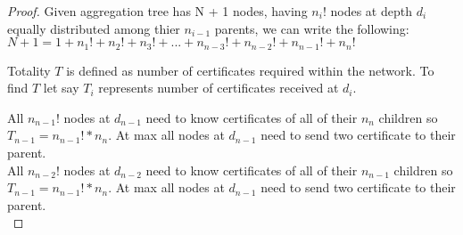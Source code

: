 \begin{proof}
	Given aggregation tree has N + 1 nodes, having $n_{i}!$ nodes at depth $d_{i}$ equally distributed among thier $n_{i-1}$ parents, we can write the following:\\
	$ N + 1 = 1 + n_{1}! + n_{2}! + n_{3}! + ... + n_{n - 3}! + n_{n - 2}! + n_{n - 1}! + n_{n}! $

	Totality $T$ is defined as number of certificates required within the network. To find $T$ let say $T_{i}$ represents number of certificates received at $d_{i}$.

	All $ n_{n-1} ! $ nodes at $ d_{n-1} $ need to know certificates of all of their $ n_{n} $ children so $T_{n-1} = n_{n-1} ! * n_{n} $. At max all nodes at $d_{n-1}$ need to send two certificate to their parent.\\

	All $ n_{n-2} ! $ nodes at $ d_{n-2} $ need to know certificates of all of their $ n_{n-1} $ children so $T_{n-1} = n_{n-1} ! * n_{n} $. At max all nodes at $d_{n-1}$ need to send two certificate to their parent.\\

\end{proof}